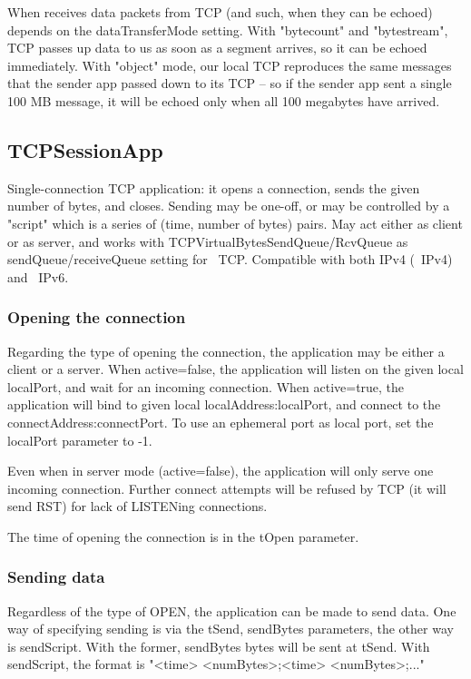 When  receives data packets from TCP (and such, when they can be
echoed) depends on the dataTransferMode setting.
With "bytecount" and "bytestream", TCP passes up data to us
as soon as a segment arrives, so it can be echoed immediately.
With "object" mode, our local TCP reproduces the same
messages that the sender app passed down to its TCP -- so if the sender
app sent a single 100 MB message, it will be echoed only when all
100 megabytes have arrived.

\subsection{TCPSessionApp}

Single-connection TCP application: it opens a connection, sends
the given number of bytes, and closes. Sending may be one-off,
or may be controlled by a "script" which is a series of
(time, number of bytes) pairs. May act either as client or as server,
and works with TCPVirtualBytesSendQueue/RcvQueue as sendQueue/receiveQueue
setting for ~TCP.
Compatible with both IPv4 (~IPv4) and ~IPv6.

\subsubsection*{Opening the connection}

Regarding the type of opening the connection, the application may
be either a client or a server. When active=false, the application
will listen on the given local localPort, and wait for an incoming connection.
When active=true, the application will bind to given local localAddress:localPort,
and connect to the connectAddress:connectPort. To use an ephemeral port
as local port, set the localPort parameter to -1.

Even when in server mode (active=false), the application will only
serve one incoming connection. Further connect attempts will be
refused by TCP (it will send RST) for lack of LISTENing connections.

The time of opening the connection is in the tOpen parameter.

\subsubsection*{Sending data}

Regardless of the type of OPEN, the application can be made to send
data. One way of specifying sending is via the tSend, sendBytes
parameters, the other way is sendScript. With the former, sendBytes
bytes will be sent at tSend. With sendScript, the format is
"<time> <numBytes>;<time> <numBytes>;..."

